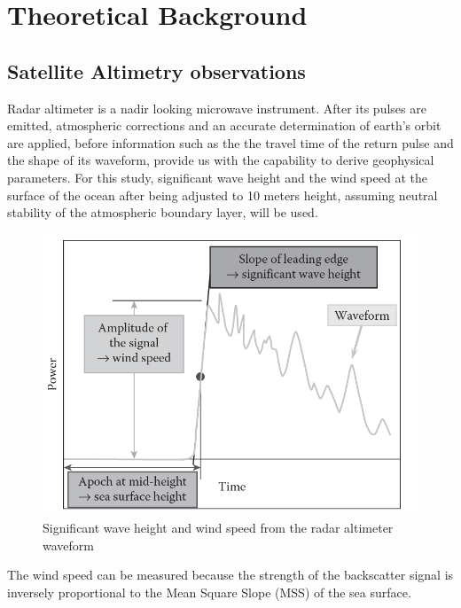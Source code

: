 
\chapter{Theoretical Background} %

\label{Chapter2} %


\section{Satellite Altimetry observations}

Radar altimeter is a nadir looking microwave instrument. After its pulses are emitted, atmospheric corrections and an accurate determination of earth's orbit are applied, before information such as the the travel time of the return pulse and the shape of its waveform, provide us with the capability to  derive geophysical parameters. For this study, significant wave height and the wind speed at the surface of the ocean after being adjusted to 10 meters height, assuming neutral stability of the atmospheric boundary layer, will be used.

\begin{figure}[th]
\centering
\includegraphics[width=\linewidth]{Figures/Chapter2/altimetry_principle.png}
\caption{Significant wave height and wind speed from the radar altimeter waveform}
\label{fig:altimetry_principle}
\end{figure}

The wind speed can be measured because the strength of the backscatter signal is inversely proportional to the Mean Square Slope (MSS) of the sea surface. 


